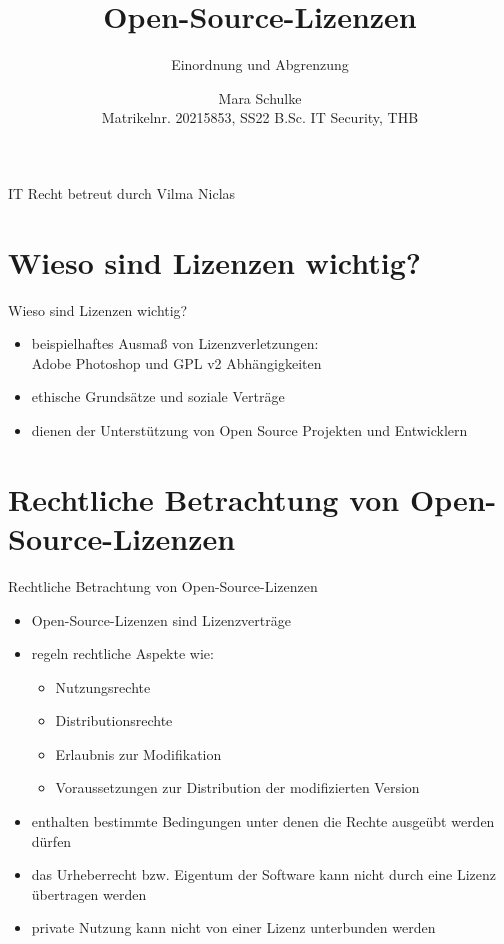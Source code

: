 \documentclass{beamer}
\title{Open-Source-Lizenzen}
\subtitle{Einordnung und Abgrenzung}
\author{Mara Schulke\\\tiny{Matrikelnr. 20215853, SS22 B.Sc. IT Security, THB}}
\begin{document}
\begin{frame}
	IT Recht \hfill betreut durch Vilma Niclas
	\vspace{1em}
	\titlepage
\end{frame}

\section{Wieso sind Lizenzen wichtig?}
\begin{frame}{Wieso sind Lizenzen wichtig?}
	\begin{itemize}
		\item beispielhaftes Ausmaß von Lizenzverletzungen:\\
			Adobe Photoshop und GPL v2 Abhängigkeiten
		\vspace{2em}
		\item ethische Grundsätze und soziale Verträge
		\item dienen der Unterstützung von Open Source Projekten und
			Entwicklern
	\end{itemize}
\end{frame}

\section{Rechtliche Betrachtung von Open-Source-Lizenzen}
\begin{frame}{Rechtliche Betrachtung von Open-Source-Lizenzen}
	\begin{itemize}
		\item Open-Source-Lizenzen sind Lizenzverträge
		\item regeln rechtliche Aspekte wie:
			\begin{itemize}
				\item Nutzungsrechte
				\item Distributionsrechte
				\item Erlaubnis zur Modifikation
				\item Voraussetzungen zur Distribution der modifizierten
					Version
			\end{itemize}
		\item enthalten bestimmte Bedingungen unter denen die Rechte ausgeübt
			werden dürfen
		\item das Urheberrecht bzw. Eigentum der Software kann nicht durch eine
			Lizenz übertragen werden
		\item private Nutzung kann nicht von einer Lizenz unterbunden werden
	\end{itemize}
\end{frame}
\end{document}
